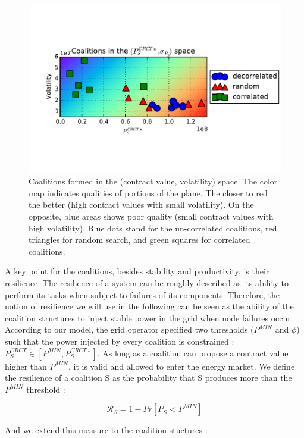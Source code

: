 \documentclass[conference]{IEEEtran}
\begin{document}
\begin{figure}
\includegraphics[scale=.6]{./figures/coalitions/coalitions.pdf}
\caption{Coalitions formed in the (contract value, volatility) space. The color map indicates qualities of portions of the plane. The closer to red the better (high contract values with small volatility). On the opposite, blue areas shows poor quality (small contract values with high volatility). Blue dots stand for the un-correlated coalitions, red triangles for random search, and green squares for correlated coalitions.}
\label{fig:coalitions}
\end{figure}

A key point for the coalitions, besides stability and productivity, is their resilience. The resilience of a system can be roughly described as its ability to perform its tasks when subject to failures of its components. Therefore, the notion of resilience we will use in the following can be seen as the ability of the coalition structures to inject stable power in the grid when node failures occur. According to our model, the grid operator specified two thresholds ($P^{MIN}$ and $ \phi $) such that the power injected by every coalition is constrained : $ P_{S}^{CRCT} \in [P^{MIN}, P_{S}^{CRCT \star}] $. As long as a coalition can propose a contract value higher than $ P^{MIN} $, it is valid and allowed to enter the energy market. We define the resilience of a coalition S as the probability that S produces more than the $ P^{MIN} $ threshold :

\begin{equation}
\mathcal{R}_{S} = 1 - Pr[P_{S} < P^{MIN}]
\end{equation}

And we extend this measure to the coalition stuctures :
\end{document}
